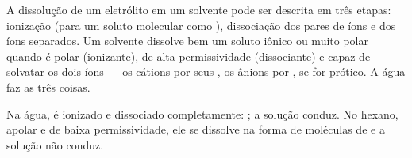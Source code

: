\begin{proposition}\label{prop:b1:intermolecular-forces-solvents:steps}
A dissolução de um eletrólito em um solvente pode ser descrita em três
etapas: ionização (para um soluto molecular como ), dissociação
dos pares de íons e  dos íons separados. Um solvente dissolve
bem um soluto iônico ou muito polar quando é polar (ionizante), de alta
permissividade (dissociante) e capaz de solvatar os dois íons --- os
cátions por seus , os ânions por , se for prótico. A água faz as três coisas.
\end{proposition}

\begin{example}\label{ex:b1:intermolecular-forces-solvents:hcl}
Na água,  é ionizado e dissociado completamente:
; a solução conduz. No
hexano, apolar e de baixa permissividade, ele se dissolve na forma de
moléculas de  e a solução não conduz.
\end{example}

